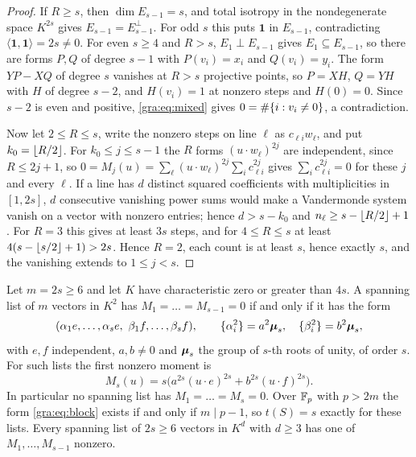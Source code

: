 \begin{proof}
If $R\ge s$, then $\dim E_{s-1}=s$, and total isotropy in the
nondegenerate space $K^{2s}$ gives $E_{s-1}=E_{s-1}^\perp$. For odd $s$ this
puts $\mathbf1$ in $E_{s-1}$, contradicting $\langle\mathbf1,\mathbf1\rangle
=2s\ne0$. For even $s\ge4$ and $R>s$, $E_1\perp E_{s-1}$ gives
$E_1\subseteq E_{s-1}$, so there are forms $P,Q$ of degree $s-1$ with
$P(v_i)=x_i$ and $Q(v_i)=y_i$. The form $YP-XQ$ of degree $s$ vanishes at
$R>s$ projective points, so $P=XH$, $Q=YH$ with $H$ of degree $s-2$, and
$H(v_i)=1$ at nonzero steps and $H(0)=0$. Since $s-2$ is even and positive,
\eqref{gra:eq:mixed} gives $0=\#\{i:v_i\ne0\}$, a contradiction.

Now let $2\le R\le s$, write the nonzero steps on line $\ell$ as
$c_{\ell i}w_\ell$, and put $k_0=\lfloor R/2\rfloor$. For $k_0\le j\le s-1$ the $R$
forms $(u\cdot w_\ell)^{2j}$ are independent, since $R\le2j+1$, so
$0=M_j(u)=\sum_\ell(u\cdot w_\ell)^{2j}\sum_ic_{\ell i}^{2j}$ gives
$\sum_ic_{\ell i}^{2j}=0$ for these $j$ and every $\ell$. If a line has $d$
distinct squared coefficients with multiplicities in $[1,2s]$, $d$
consecutive vanishing power sums would make a Vandermonde system vanish on
a vector with nonzero entries; hence $d>s-k_0$ and
$n_\ell\ge s-\lfloor R/2\rfloor+1$. For $R=3$ this gives at least $3s$ steps, and for
$4\le R\le s$ at least $4(s-\lfloor s/2\rfloor+1)>2s$. Hence $R=2$, each count is
at least $s$, hence exactly $s$, and the vanishing extends to $1\le j<s$.
\end{proof}

\begin{theorem}\label{gra:thm:rigidity}
Let $m=2s\ge6$ and let $K$ have characteristic zero or greater than $4s$.
A spanning list of $m$ vectors in $K^2$ has $M_1=\dots=M_{s-1}=0$ if and
only if it has the form
\begin{equation}\label{gra:eq:block}
 (\alpha_1e,\dots,\alpha_se,\ \beta_1f,\dots,\beta_sf),\qquad
 \{\alpha_i^2\}=a^2\boldsymbol{\mu}_s,\quad \{\beta_i^2\}=b^2\boldsymbol{\mu}_s,
\end{equation}
with $e,f$ independent, $a,b\ne0$ and $\boldsymbol{\mu}_s$ the group of $s$-th roots of
unity, of order $s$. For such lists the first nonzero moment is
\[
 M_s(u)=s\bigl(a^{2s}(u\cdot e)^{2s}+b^{2s}(u\cdot f)^{2s}\bigr).
\]
In particular no spanning list has $M_1=\dots=M_s=0$. Over $\mathbb{F}_p$ with
$p>2m$ the form \eqref{gra:eq:block} exists if and only if $m\mid p-1$, so
$t(S)=s$ exactly for these lists. Every spanning list of $2s\ge6$ vectors
in $K^d$ with $d\ge3$ has one of $M_1,\dots,M_{s-1}$ nonzero.
\end{theorem}

